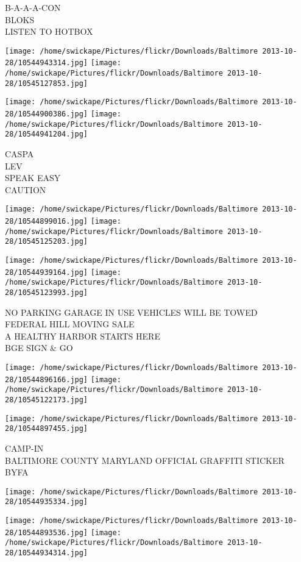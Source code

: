 \documentclass[10pt,letterpaper]{article}
\begin{document}
B{-}A{-}A{-}A{-}CON\\
BLOKS\\
LISTEN TO HOTBOX
\pagebreak

\texttt{[image: /home/swickape/Pictures/flickr/Downloads/Baltimore 2013-10-28/10544943314.jpg]}
\texttt{[image: /home/swickape/Pictures/flickr/Downloads/Baltimore 2013-10-28/10545127853.jpg]}

\texttt{[image: /home/swickape/Pictures/flickr/Downloads/Baltimore 2013-10-28/10544900386.jpg]}
\texttt{[image: /home/swickape/Pictures/flickr/Downloads/Baltimore 2013-10-28/10544941204.jpg]}

CASPA\\
LEV\\
SPEAK EASY\\
CAUTION
\pagebreak

\texttt{[image: /home/swickape/Pictures/flickr/Downloads/Baltimore 2013-10-28/10544899016.jpg]}
\texttt{[image: /home/swickape/Pictures/flickr/Downloads/Baltimore 2013-10-28/10545125203.jpg]}

\texttt{[image: /home/swickape/Pictures/flickr/Downloads/Baltimore 2013-10-28/10544939164.jpg]}
\texttt{[image: /home/swickape/Pictures/flickr/Downloads/Baltimore 2013-10-28/10545123993.jpg]}

NO PARKING GARAGE IN USE VEHICLES WILL BE TOWED\\
FEDERAL HILL MOVING SALE\\
A HEALTHY HARBOR STARTS HERE\\
BGE SIGN \& GO
\pagebreak

\texttt{[image: /home/swickape/Pictures/flickr/Downloads/Baltimore 2013-10-28/10544896166.jpg]}
\texttt{[image: /home/swickape/Pictures/flickr/Downloads/Baltimore 2013-10-28/10545122173.jpg]}

\vspace{0.25in}
\texttt{[image: /home/swickape/Pictures/flickr/Downloads/Baltimore 2013-10-28/10544897455.jpg]}

CAMP{-}IN\\
BALTIMORE COUNTY MARYLAND OFFICIAL GRAFFITI STICKER\\
BYFA
\pagebreak

\texttt{[image: /home/swickape/Pictures/flickr/Downloads/Baltimore 2013-10-28/10544935334.jpg]}

\vspace{0.25in}
\texttt{[image: /home/swickape/Pictures/flickr/Downloads/Baltimore 2013-10-28/10544893536.jpg]}
\texttt{[image: /home/swickape/Pictures/flickr/Downloads/Baltimore 2013-10-28/10544934314.jpg]}
\end{document}
